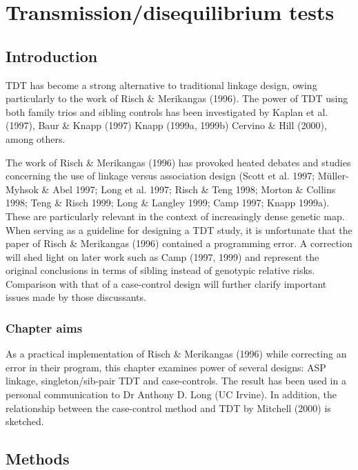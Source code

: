 
\chapter{Transmission/disequilibrium tests}

\section{Introduction}

TDT has become a strong alternative to traditional linkage design, owing
particularly to the work of Risch \& Merikangas (1996).  The power of TDT using
both family trios and sibling controls has been investigated by Kaplan et al.
(1997), Baur \& Knapp (1997) Knapp (1999a, 1999b) Cervino \& Hill (2000), among
others.

The work of Risch \& Merikangas (1996) has provoked heated debates and studies
concerning the use of linkage versus association design (Scott et al.  1997;
M\"{u}ller-Myhsok \& Abel 1997; Long et al.  1997; Risch \& Teng 1998; Morton
\& Collins 1998; Teng \& Risch 1999; Long \& Langley 1999; Camp 1997; Knapp
1999a). These are particularly relevant in the context of increasingly dense
genetic map.  When serving as a guideline for designing a TDT study, it is
unfortunate that the paper of Risch \& Merikangas (1996) contained a
programming error.  A correction will shed light on later work such as Camp
(1997, 1999) and represent the original conclusions in terms of sibling instead
of genotypic relative risks. Comparison with that of a case-control design will
further clarify important issues made by those discussants.


\subsection*{Chapter aims}

As a practical implementation of Risch \& Merikangas (1996) while correcting an
error in their program, this chapter examines power of several designs:  ASP
linkage, singleton/sib-pair TDT and case-controls.  The result has been used in
a personal communication to Dr Anthony D. Long (UC Irvine).  In addition, the
relationship between the case-control method and TDT by Mitchell (2000) is
sketched.


\section{Methods}

